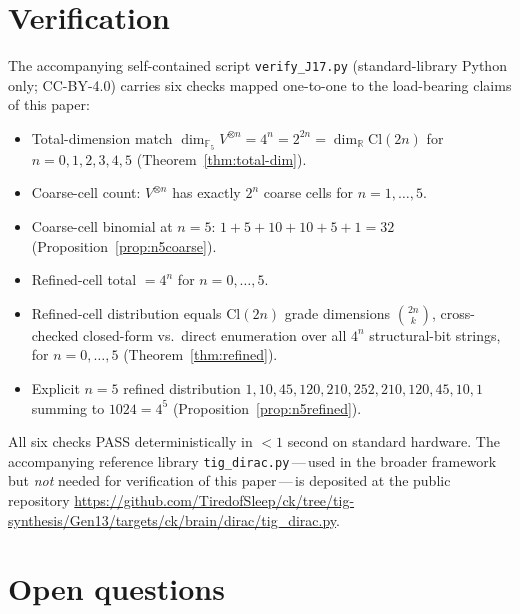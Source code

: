 \documentclass[11pt,reqno]{amsart}
\theoremstyle{plain}
\theoremstyle{definition}
\theoremstyle{remark}
\newcommand{\F}{\mathbb{F}}
\newcommand{\R}{\mathbb{R}}
\newcommand{\Cl}{\mathrm{Cl}}
\begin{document}
\section{Verification}

The accompanying self-contained script \texttt{verify\_J17.py}
(standard-library Python only; CC-BY-4.0) carries six checks mapped
one-to-one to the load-bearing claims of this paper:
\begin{itemize}
\item[C1.] Total-dimension match $\dim_{\F_5} V^{\otimes n} =
4^n = 2^{2n} = \dim_\R \Cl(2n)$ for $n = 0, 1, 2, 3, 4, 5$
(Theorem~\ref{thm:total-dim}).
\item[C2.] Coarse-cell count: $V^{\otimes n}$ has exactly $2^n$ coarse
cells for $n = 1, \ldots, 5$.
\item[C3.] Coarse-cell binomial at $n = 5$:
$1 + 5 + 10 + 10 + 5 + 1 = 32$ (Proposition~\ref{prop:n5coarse}).
\item[C4.] Refined-cell total $= 4^n$ for $n = 0, \ldots, 5$.
\item[C5.] Refined-cell distribution equals Cl$(2n)$ grade dimensions
$\binom{2n}{k}$, cross-checked closed-form vs.\ direct enumeration
over all $4^n$ structural-bit strings, for $n = 0, \ldots, 5$
(Theorem~\ref{thm:refined}).
\item[C6.] Explicit $n = 5$ refined distribution
$1, 10, 45, 120, 210, 252, 210, 120, 45, 10, 1$ summing to
$1024 = 4^5$ (Proposition~\ref{prop:n5refined}).
\end{itemize}
All six checks PASS deterministically in $<1$ second on standard
hardware. The accompanying reference library
\texttt{tig\_dirac.py}\,---\,used in the broader framework but
\emph{not} needed for verification of this paper\,---\,is deposited at
the public repository
\url{https://github.com/TiredofSleep/ck/tree/tig-synthesis/Gen13/targets/ck/brain/dirac/tig_dirac.py}.

\section{Open questions}
\label{sec:open}
\end{document}
